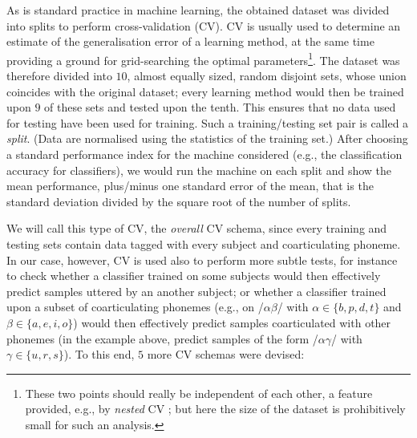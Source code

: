 As is standard practice in machine learning, the obtained dataset was divided into
splits to perform cross-validation (CV). CV \cite{stat} is usually used
to determine an estimate of the generalisation error of a learning method, at the
same time providing a ground for grid-searching the optimal parameters\footnote{These
two points should really be independent of each other, a feature provided, e.g., by
\emph{nested} CV \cite{nestedCV}; but here the size of the dataset is
prohibitively small for such an analysis.}. The dataset was therefore divided into
$10$, almost equally sized, random disjoint sets,
whose union coincides with the original dataset; every
learning method would then be trained upon $9$ of these sets and tested upon the
tenth. This ensures that no data used for testing have been used for training. Such a
training/testing set pair is called a \emph{split}. (Data are normalised using the
statistics of the training set.) After choosing a standard performance index for the machine
considered (e.g., the classification accuracy for classifiers), we would run the machine
on each split and show the mean performance, plus/minus one standard error of the mean,
that is the standard deviation divided by the square root of the number of splits.

We will call this type of CV, the \emph{overall} CV schema,
since every training and testing sets contain data tagged with every subject and
coarticulating phoneme. In our case, however, CV is used also to perform more subtle
tests, for instance to check whether a classifier trained on some subjects would
then effectively predict samples uttered by an another subject; or whether a classifier
trained upon a subset of coarticulating phonemes (e.g., on /$\alpha\beta$/ with
$\alpha \in \{b,p,d,t\}$ and $\beta \in \{a,e,i,o\}$) would then effectively predict samples
coarticulated with other phonemes (in the example above, predict samples of the form
/$\alpha\gamma$/ with $\gamma \in \{u,r,s\}$). To this end, $5$ more CV schemas were devised:

